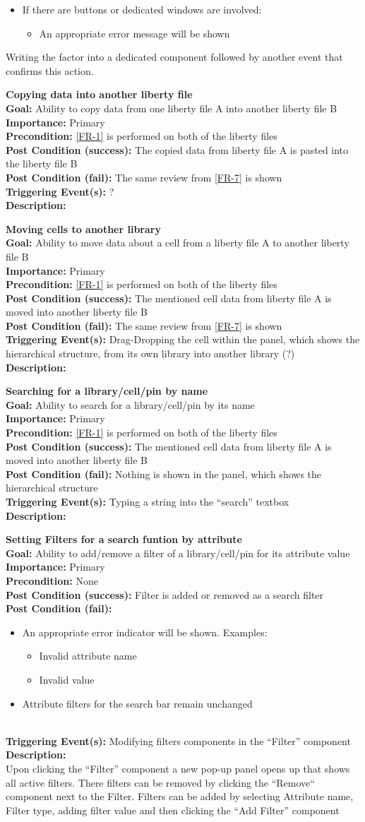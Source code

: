 \documentclass[10pt,a4paper]{report}
\newcommand{\FRDescription}[8]{
    \textbf{#1} \leavevmode \\
    \textbf{Goal: } #2 \leavevmode \\
    \textbf{Importance: } #3 \leavevmode \\
    \textbf{Precondition: } #4 \leavevmode \\
    \textbf{Post Condition (success): } #5 \leavevmode \\
    \textbf{Post Condition (fail): } #6 \leavevmode \\
    \textbf{Triggering Event(s): } #7 \leavevmode \\
    \textbf{Description: } \leavevmode \\ 
    #8}
\begin{document}
\begin{FR}
{\begin{itemize}
\begin{itemize}
            \item If there are buttons or dedicated windows are involved:
            \begin{itemize}
                \item An appropriate error message will be shown
            \end{itemize}
        \end{itemize}
    \end{itemize}}
    {Writing the factor into a dedicated component followed by another event that confirms this action.}
    \item \FRDescription{Copying data into another liberty file}
    {Ability to copy data from one liberty file A into another liberty file B}
    {Primary}
    {\ref{FR-1} is performed on both of the liberty files}
    {The copied data from liberty file A is pasted into the liberty file B}
    {The same review from \ref{FR-7} is shown}
    {?}
    \item \FRDescription{Moving cells to another library}
    {Ability to move data about a cell from a liberty file A to another liberty file B}
    {Primary}
    {\ref{FR-1} is performed on both of the liberty files}
    {The mentioned cell data from liberty file A is moved into another liberty file B}
    {The same review from \ref{FR-7} is shown}
    {Drag-Dropping the cell within the panel, which shows the hierarchical structure, from its own library into another library (?)}
    \item \FRDescription{Searching for a library/cell/pin by name}
    {Ability to search for a library/cell/pin by its name}
    {Primary}
    {\ref{FR-1} is performed on both of the liberty files}
    {The mentioned cell data from liberty file A is moved into another liberty file B}
    {Nothing is shown in the panel, which shows the hierarchical structure}
    {Typing a string into the “search” textbox}
    \item \FRDescription{Setting Filters for a search funtion by attribute}
    {Ability to add/remove a filter of a library/cell/pin for its attribute value}
    {Primary}
    {None}
    {Filter is added or removed as a search filter}
    {\begin{itemize}
        \item An appropriate error indicator will be shown. Examples:
        \begin{itemize}
            \item Invalid attribute name
            \item Invalid value
        \end{itemize}
        \item Attribute filters for the search bar remain unchanged
    \end{itemize}}
    {Modifying filters components in the “Filter” component}
    {Upon clicking the “Filter” component a new pop-up panel opens up that shows all active filters. There filters can be removed by clicking the “Remove“ component next to the Filter. Filters can be added by selecting Attribute name, Filter type, adding filter value and then clicking the “Add Filter” component}
\end{FR}
\end{document}
